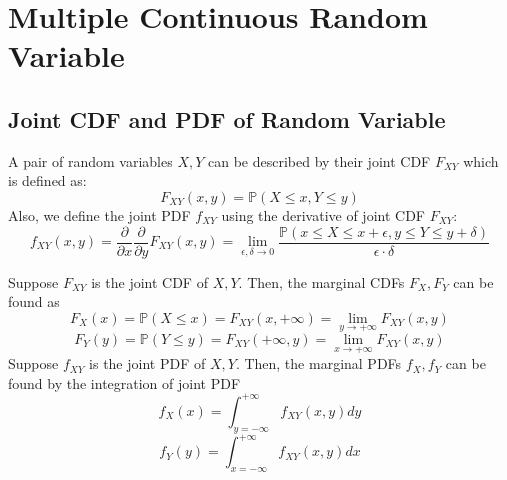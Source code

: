 \section{Multiple Continuous Random Variable}

\subsection{Joint CDF and PDF of Random Variable}
\begin{definition}
    A pair of random variables \(X, Y\) can be described by their joint CDF \(F_{XY}\) which is defined as:
    \[
        F_{XY}(x, y) = \mathbb{P}(X \leq x, Y \leq y)
    \]
    Also, we define the joint PDF \(f_{XY}\) using the derivative of joint CDF \(F_{XY}\): 
    \[
        f_{XY}(x, y) = \frac{\partial}{\partial x} \frac{\partial}{\partial y} F_{XY}(x, y) = \lim_{\epsilon, \delta \to 0} \dfrac{\mathbb{P}(x \leq X \leq x + \epsilon, y \leq Y \leq y + \delta)}{\epsilon \cdot \delta} 
    \] 
\end{definition}

Suppose \(F_{XY}\) is the joint CDF of \(X, Y\). Then, the marginal CDFs \(F_X, F_Y\) can be found as 
\[
    F_X(x) = \mathbb{P}(X \leq x) = F_{XY}(x, +\infty) = \lim_{y \to +\infty} F_{XY}(x, y)
\]
\[
    F_Y(y) = \mathbb{P}(Y \leq y) = F_{XY}(+\infty, y) = \lim_{x \to +\infty} F_{XY}(x, y)
\]
Suppose \(f_{XY}\) is the joint PDF of \(X, Y\). Then, the marginal PDFs \(f_X, f_Y\) can be found by the integration of joint PDF
\[
    f_X(x) = \int_{y = -\infty}^{+\infty} f_{XY}(x, y) dy 
\]
\[
    f_Y(y) = \int_{x = -\infty}^{+\infty} f_{XY}(x, y) dx 
\]


